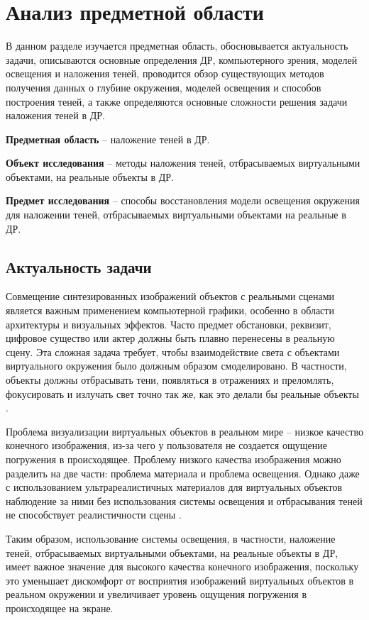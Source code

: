 \chapter{Анализ предметной области}

В данном разделе изучается предметная область, обосновывается актуальность задачи, описываются основные определения ДР, компьютерного зрения, моделей освещения и наложения теней, проводится обзор существующих методов получения данных о глубине окружения, моделей освещения и способов построения теней, а также определяются основные сложности решения задачи наложения теней в ДР.

\textbf{Предметная область} -- наложение теней в ДР.

\textbf{Объект исследования} -- методы наложения теней, отбрасываемых виртуальными объектами, на реальные объекты в ДР.

\textbf{Предмет исследования} -- способы восстановления модели освещения окружения для наложении теней, отбрасываемых виртуальными объектами на реальные в ДР.

\section{Актуальность задачи}

Совмещение синтезированных изображений объектов с реальными сценами является важным применением компьютерной графики, особенно в области архитектуры и визуальных эффектов. Часто предмет обстановки, реквизит, цифровое существо или актер должны быть плавно перенесены в реальную сцену. Эта сложная задача требует, чтобы взаимодействие света с объектами виртуального окружения было должным образом смоделировано. В частности, объекты должны отбрасывать тени, появляться в отражениях и преломлять, фокусировать и излучать свет точно так же, как это делали бы реальные объекты \cite{debevec2008rendering}.

Проблема визуализации виртуальных объектов в реальном мире -- низкое качество конечного изображения, из-за чего у пользователя не создается ощущение погружения в происходящее. Проблему низкого качества изображения можно разделить на две части: проблема материала и проблема освещения. Однако даже с использованием ультрареалистичных материалов для виртуальных объектов наблюдение за ними без использования системы освещения и отбрасывания теней не способствует реалистичности сцены \cite{osti2019real}.

Таким образом, использование системы освещения, в частности, наложение теней, отбрасываемых виртуальными объектами, на реальные объекты в ДР, имеет важное значение для высокого качества конечного изображения, поскольку это уменьшает дискомфорт от восприятия изображений виртуальных объектов в реальном окружении и увеличивает уровень ощущения погружения в происходящее на экране.

